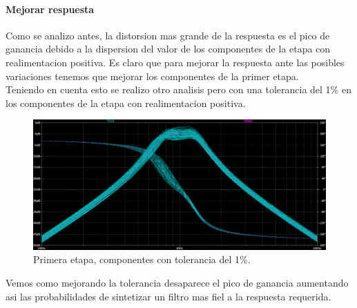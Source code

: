 \paragraph{Mejorar respuesta}

Como se analizo antes, la distorsion mas grande de la respuesta es el pico de ganancia debido a la dispersion del valor de los componentes de la etapa con realimentacion positiva. Es claro que para mejorar la respuesta ante las posibles variaciones tenemos que mejorar los componentes de la primer etapa. \\

Teniendo en cuenta esto se realizo otro analisis pero con una tolerancia del 1\% en los componentes de la etapa con realimentacion positiva.

\begin{figure}[H]
    \centering
    \includegraphics[scale=.3]{Secciones/Circ1/img/mtcarloMejorado.png}
    \caption{Primera etapa, componentes con tolerancia del 1\%.}
\end{figure}

Vemos como mejorando la tolerancia desaparece el pico de ganancia aumentando asi las probabilidades de sintetizar un filtro mas fiel a la respuesta requerida.